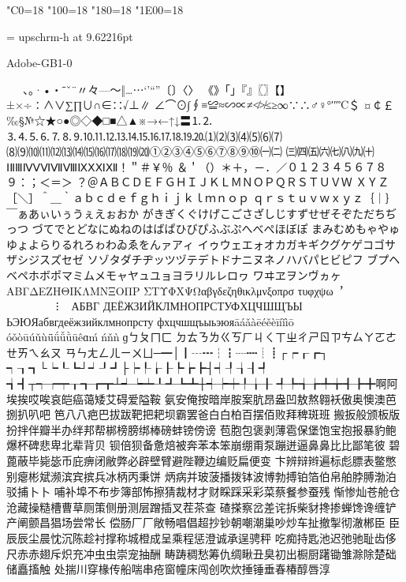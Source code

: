 %
%
%
%
\kcatcode"C0=18%
\kcatcode"100=18%
\kcatcode"180=18%
\kcatcode"1E00=18%

\font\upschrm = upschrm-h at 9.62216pt
\upschrm


Adobe-GB1-0

 　、。·•・ˉˇ¨〃々—～‖…⋯‘’“”〔〕〈〉
《》「」『』〖〗【】±×÷∶∧∨∑∏∪∩∈∷√⊥∥
∠⌒⊙∫∮≡≌≈∽∝≠≮≯≤≥∞∵∴♂♀°′″℃＄
¤￠￡‰§№☆★○●◎◇◆□■△▲※→←↑↓〓⒈⒉
⒊⒋⒌⒍⒎⒏⒐⒑⒒⒓⒔⒕⒖⒗⒘⒙⒚⒛⑴⑵⑶⑷⑸⑹⑺
⑻⑼⑽⑾⑿⒀⒁⒂⒃⒄⒅⒆⒇①②③④⑤⑥⑦⑧⑨⑩㈠㈡
㈢㈣㈤㈥㈦㈧㈨㈩ⅠⅡⅢⅣⅤⅥⅦⅧⅨⅩⅪⅫ！＂＃￥％
＆＇（）＊＋，－．／０１２３４５６７８９：；＜＝＞
？＠ＡＢＣＤＥＦＧＨＩＪＫＬＭＮＯＰＱＲＳＴＵＶＷ
ＸＹＺ［＼］＾＿｀ａｂｃｄｅｆｇｈｉｊｋｌｍｎｏｐ
ｑｒｓｔｕｖｗｘｙｚ｛｜｝￣ぁあぃいぅうぇえぉおか
がきぎくぐけげこごさざしじすずせぜそぞただちぢっつ
づてでとどなにぬねのはばぱひびぴふぶぷへべぺほぼぽ
まみむめもゃやゅゆょよらりるれろゎわゐゑをんァアィ
イゥウェエォオカガキギクグケゲコゴサザシジスズセゼ
ソゾタダチヂッツヅテデトドナニヌネノハバパヒビピフ
ブプヘベペホボポマミムメモャヤュユョヨラリルレロヮ
ワヰヱヲンヴヵヶΑΒΓΔΕΖΗΘΙΚΛΜΝΞΟΠΡ
ΣΤΥΦΧΨΩαβγδεζηθικλμνξοπρσ
τυφχψω︐︒︑︓︔︕︖︵︶︹︺︿
﹀︽︾﹁﹂﹃﹄︗︘︻︼︷︸︱⁝︙︳︴АБВГ
ДЕЁЖЗИЙКЛМНОПРСТУФХЦЧШЩЪЫ
ЬЭЮЯабвгдеёжзийклмнопрсту
фхцчшщъыьэюяāáǎàēéěèīíǐìō
óǒòūúǔùǖǘǚǜüêɑḿńňǹɡㄅㄆㄇㄈ
ㄉㄊㄋㄌㄍㄎㄏㄐㄑㄒㄓㄔㄕㄖㄗㄘㄙㄚㄛㄜㄝㄞㄟㄠㄡ
ㄢㄣㄤㄥㄦㄧㄨㄩ─━│┃┄┅┆┇┈┉┊┋┌┍┎┏┐
┑┒┓└┕┖┗┘┙┚┛├┝┞┟┠┡┢┣┤┥┦┧┨┩
┪┫┬┭┮┯┰┱┲┳┴┵┶┷┸┹┺┻┼┽┾┿╀╁╂
╃╄╅╆╇╈╉╊╋啊阿埃挨哎唉哀皑癌蔼矮艾碍爱隘鞍
氨安俺按暗岸胺案肮昂盎凹敖熬翱袄傲奥懊澳芭捌扒叭吧
笆⼋八疤巴拔跋靶把耙坝霸罢爸⽩白柏百摆佰败拜稗斑班
搬扳般颁板版扮拌伴瓣半办绊邦帮梆榜膀绑棒磅蚌镑傍谤
苞胞包褒剥薄雹保堡饱宝抱报暴豹鲍爆杯碑悲卑北辈背贝
钡倍狈备惫焙被奔苯本笨崩绷甭泵蹦迸逼⿐鼻⽐比鄙笔彼
碧蓖蔽毕毙毖币庇痹闭敝弊必辟壁臂避陛鞭边编贬扁便变
卞辨辩辫遍标彪膘表鳖憋别瘪彬斌濒滨宾摈兵冰柄丙秉饼
炳病并玻菠播拨钵波博勃搏铂箔伯帛舶脖膊渤泊驳捕⼘卜
哺补埠不布步簿部怖擦猜裁材才财睬踩采彩菜蔡餐参蚕残
惭惨灿苍舱仓沧藏操糙槽曹草厕策侧册测层蹭插叉茬茶查
碴搽察岔差诧拆柴豺搀掺蝉馋谗缠铲产阐颤昌猖场尝常长
偿肠⼚厂敞畅唱倡超抄钞朝嘲潮巢吵炒车扯撤掣彻澈郴⾂
臣⾠辰尘晨忱沉陈趁衬撑称城橙成呈乘程惩澄诚承逞骋秤
吃痴持匙池迟弛驰耻齿侈尺⾚赤翅斥炽充冲⾍虫崇宠抽酬
畴踌稠愁筹仇绸瞅丑臭初出橱厨躇锄雏滁除楚础储矗搐触
处揣川穿椽传船喘串疮窗幢床闯创吹炊捶锤垂春椿醇唇淳
